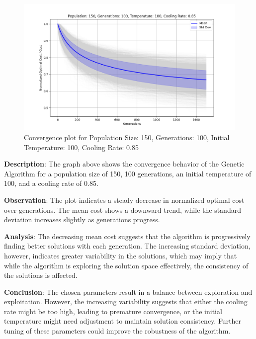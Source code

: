 \documentclass[
]{article}
\begin{document}
    \begin{figure}[H]
        \centering
        \includegraphics[width=\textwidth]{genetic_simulated_annealing_hybrid/Population_150_Generations_100_Temperature_100_CoolingRate_0.85}
        \caption{Convergence plot for Population Size: 150, Generations: 100, Initial Temperature: 100, Cooling Rate: 0.85}
        \label{fig:pop150_gen100_temp100_cr0.85}
    \end{figure}

    \textbf{Description}: The graph above shows the convergence behavior of the Genetic Algorithm for a population size of 150, 100 generations, an initial temperature of 100, and a cooling rate of 0.85.

    \textbf{Observation}: The plot indicates a steady decrease in normalized optimal cost over generations. The mean cost shows a downward trend, while the standard deviation increases slightly as generations progress.

    \textbf{Analysis}: The decreasing mean cost suggests that the algorithm is progressively finding better solutions with each generation. The increasing standard deviation, however, indicates greater variability in the solutions, which may imply that while the algorithm is exploring the solution space effectively, the consistency of the solutions is affected.

    \textbf{Conclusion}: The chosen parameters result in a balance between exploration and exploitation. However, the increasing variability suggests that either the cooling rate might be too high, leading to premature convergence, or the initial temperature might need adjustment to maintain solution consistency. Further tuning of these parameters could improve the robustness of the algorithm.
\end{document}
